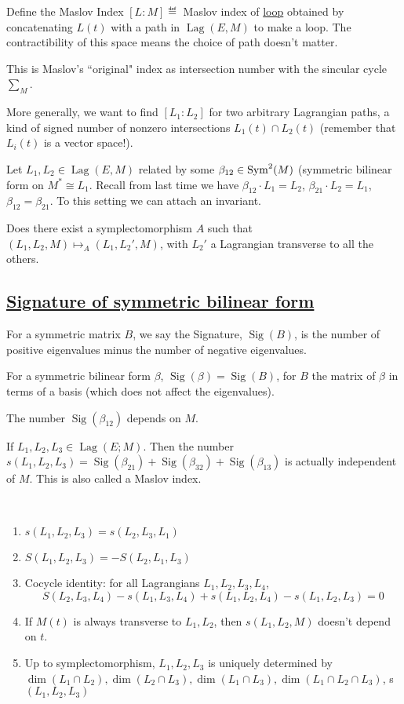\documentclass[x11names,reqno,14pt]{extarticle}
\DeclareMathOperator{\Sig}{Sig}
\DeclareMathOperator{\Lag}{Lag}
\begin{document}
Define the Maslov Index $[L:M]\eqdef$ Maslov index of \underline{loop} obtained by concatenating $L(t)$ with a path in $\Lag(E,M)$ to make a loop. The contractibility of this space means the choice of path doesn't matter. 

This is Maslov's ``original" index as intersection number with the sincular cycle $\sum_M$. 

More generally, we want to find $[L_1:L_2]$ for two arbitrary Lagrangian paths, a kind of signed number of nonzero intersections $L_1(t) \cap L_2(t)$ (remember that $L_i(t)$ is a vector space!). 

Let $L_1, L_2 \in \Lag(E,M)$ related by some $\beta_{12} \in \operatorname{\mathrm{Sym}}^2(M)$ (symmetric bilinear form on $M^* \cong L_1$. Recall from last time we have $\beta_{12} \cdot L_1 = L_2$, $\beta_{21} \cdot L_2 = L_1$, $\beta_{12} = \beta_{21}$. To this setting we can attach an invariant. 

Does there exist a symplectomorphism $A$ such that $(L_1, L_2, M) \mapsto_A (L_1, L_2', M)$, with $L_2'$ a Lagrangian transverse to all the others. 

\subsection*{\underline{Signature of symmetric bilinear form}}

For a symmetric matrix $B$, we say the Signature, $\Sig(B)$, is the number of positive eigenvalues minus the number of negative eigenvalues. 

For a symmetric bilinear form $\beta$, $\Sig(\beta) = \Sig(B)$, for $B$ the matrix of $\beta$ in terms of a basis (which does not affect the eigenvalues). 

The number $\Sig(\beta_{12})$ depends on $M$. 

\prop

If $L_1,L_2,L_3 \in \Lag(E;M)$. Then the number $s(L_1,L_2,L_3) = \Sig(\beta_{21}) + \Sig(\beta_{32}) + \Sig(\beta_{13})$ is actually independent of $M$. This is also called a Maslov index. 

\proof

\prop
\,

\begin{enumerate}

\item $s(L_1,L_2,L_3) = s(L_2,L_3,L_1)$

\item $S(L_1,L_2,L_3) = -S(L_2,L_1,L_3)$

\item Cocycle identity: for all Lagrangians $L_1,L_2,L_3,L_4$, 
\[
S(L_2,L_3,L_4) - s(L_1,L_3,L_4) + s(L_1,L_2,L_4) - s(L_1,L_2,L_3) = 0
\]

\item If $M(t)$ is always transverse to $L_1,L_2$, then $s(L_1,L_2, M)$ doesn't depend on $t$. 

\item Up to symplectomorphism, $L_1,L_2,L_3$ is uniquely determined by $\dim(L_1\cap L_2), \dim(L_2\cap L_3), \dim(L_1\cap L_3), \dim(L_1\cap L_2\cap L_3)$, s$(L_1,L_2,L_3)$

\end{enumerate}
\end{document}
